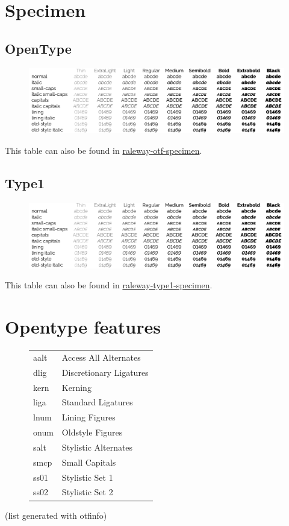 \documentclass[10pt,a4paper,english]{article}
\newcommand*\file[1]{\href{run:#1.pdf}{#1}}
\begin{document}
\section{Specimen}
\label{sec:specimen}
\subsection{OpenType}
\begin{figure}[ht]
	\centering
	\includegraphics[width=\textwidth]{raleway-otf-specimen}
\end{figure}
This table can also be found in \file{raleway-otf-specimen}.

\subsection{Type1}
\begin{figure}[ht]
	\centering
	\includegraphics[width=\textwidth]{raleway-type1-specimen}
\end{figure}
This table can also be found in \file{raleway-type1-specimen}.

\newpage
\section{Opentype features}
\label{sec:otfinfo}

\begin{figure}[ht]
	\centering
	\begin{tabular}{>{\ttfamily}l l}
		aalt & Access All Alternates \\
		dlig & Discretionary Ligatures \\
		kern & Kerning \\
		liga & Standard Ligatures \\
		lnum & Lining Figures \\
		onum & Oldstyle Figures \\
		salt & Stylistic Alternates \\
		smcp & Small Capitals \\
		ss01 & Stylistic Set 1 \\
		ss02 & Stylistic Set 2 \\
	\end{tabular}
\end{figure}
(list generated with otfinfo)
\end{document}

